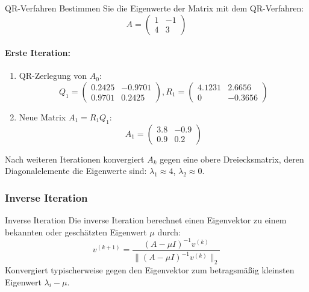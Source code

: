 \begin{example2}{QR-Verfahren}
Bestimmen Sie die Eigenwerte der Matrix mit dem QR-Verfahren:
$$A = \begin{pmatrix}
1 & -1 \\
4 & 3
\end{pmatrix}$$

\paragraph{Erste Iteration:}
\begin{enumerate}
    \item QR-Zerlegung von $A_0$:
    $$Q_1 = \begin{pmatrix}
    0.2425 & -0.9701 \\
    0.9701 & 0.2425
    \end{pmatrix}, 
    R_1 = \begin{pmatrix}
    4.1231 & 2.6656 \\
    0 & -0.3656
    \end{pmatrix}$$
    
    \item Neue Matrix $A_1 = R_1Q_1$:
    $$A_1 = \begin{pmatrix}
    3.8 & -0.9 \\
    0.9 & 0.2
    \end{pmatrix}$$
\end{enumerate}

Nach weiteren Iterationen konvergiert $A_k$ gegen eine obere Dreiecksmatrix,
deren Diagonalelemente die Eigenwerte sind: $\lambda_1 \approx 4$, $\lambda_2 \approx 0$.
\end{example2}

\subsubsection{Inverse Iteration}

\begin{concept}{Inverse Iteration}
Die inverse Iteration berechnet einen Eigenvektor zu einem bekannten oder geschätzten Eigenwert $\mu$ durch:
$$v^{(k+1)} = \frac{(A-\mu I)^{-1}v^{(k)}}{\|(A-\mu I)^{-1}v^{(k)}\|_2}$$
Konvergiert typischerweise gegen den Eigenvektor zum betragsmäßig kleinsten Eigenwert $\lambda_i - \mu$.
\end{concept}

